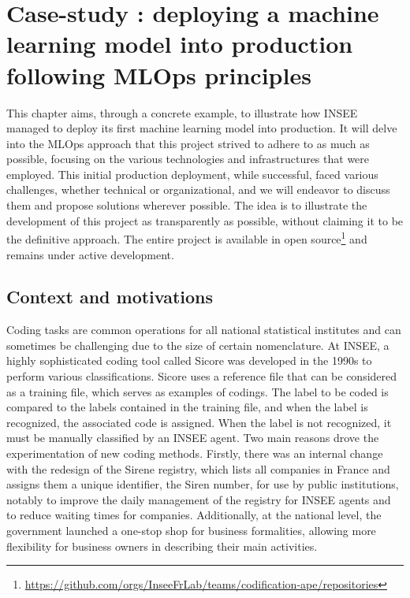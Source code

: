 \section{Case-study : deploying a machine learning model into production following MLOps principles}

This chapter aims, through a concrete example, to illustrate how INSEE managed to deploy its first machine learning model into production. It will delve into the MLOps approach that this project strived to adhere to as much as possible, focusing on the various technologies and infrastructures that were employed. This initial production deployment, while successful, faced various challenges, whether technical or organizational, and we will endeavor to discuss them and propose solutions wherever possible. The idea is to illustrate the development of this project as transparently as possible, without claiming it to be the definitive approach. The entire project is available in open source\footnote{\url{https://github.com/orgs/InseeFrLab/teams/codification-ape/repositories}} and remains under active development.

\subsection{Context and motivations}

Coding tasks are common operations for all national statistical institutes and can sometimes be challenging due to the size of certain nomenclature. At INSEE, a highly sophisticated coding tool called Sicore was developed in the 1990s to perform various classifications. Sicore uses a reference file that can be considered as a training file, which serves as examples of codings. The label to be coded is compared to the labels contained in the training file, and when the label is recognized, the associated code is assigned. When the label is not recognized, it must be manually classified by an INSEE agent. Two main reasons drove the experimentation of new coding methods. Firstly, there was an internal change with the redesign of the Sirene registry, which lists all companies in France and assigns them a unique identifier, the Siren number, for use by public institutions, notably to improve the daily management of the registry for INSEE agents and to reduce waiting times for companies. Additionally, at the national level, the government launched a one-stop shop for business formalities, allowing more flexibility for business owners in describing their main activities.

